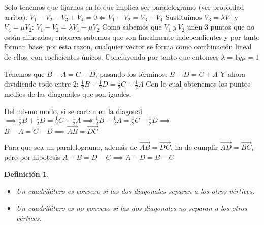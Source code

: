 \documentclass[11pt, a4paper, titlepage]{article}
\makeatletter
\renewenvironment{proof}[1][\proofname] {\vspace{-15pt}\par\pushQED{\qed}\normalfont\topsep6\p@\@plus6\p@\relax\trivlist\item[\hskip\labelsep\it#1\@addpunct{.}]\ignorespaces}{\popQED\endtrivlist\@endpefalse}
\renewcommand{\vec}{\overrightarrow}
\theoremstyle{theorem-style}
\theoremstyle{definition-style}
\newtheorem*{ndef}{Definición}
\theoremstyle{remark-style}
\theoremstyle{example-style}
\makeatother
\begin{document}
\begin{proof}\hfill
  Solo tenemos que fijarnos en lo que implica ser paralelogramo (ver propiedad arriba):
  $V_{1} - V_{2} - V_{3} + V_{4} = 0 \Leftrightarrow V_{1} - V_{2} = V_{3} - V_{4} $
  Sustituimos $V_{3} = \lambda V_{1}$ y $V_{4} = \mu V_{2}$:
  $V_{1} - V_{2} = \lambda V_{1} - \mu V_{2}$
  Como sabemos que $V_{1}\ y\ V_{2}$ unen 3 puntos que no están alineados, entonces sabemos que son linealmente independientes y por
  tanto forman base, por esta razon, cualquier vector se forma como combinación lineal de ellos, con coeficientes únicos.
  Concluyendo por tanto que entonces $\lambda = 1 y \mu = 1$

  Tenemos que $B - A = C - D$, pasando los términos:
  $B + D = C + A$
  Y ahora dividiendo todo entre 2:
  $\frac{1}{2}B + \frac{1}{2}D = \frac{1}{2}C + \frac{1}{2}A$
  Con lo cual obtenemos los puntos medios de las diagonales que son iguales.

   Del mismo modo, si se cortan en la diagonal 
  $\implies \frac{1}{2}B + \frac{1}{2}D = \frac{1}{2}C + \frac{1}{2}A \implies 
  \frac{1}{2}B - \frac{1}{2}A = \frac{1}{2}C - \frac{1}{2}D \implies $ $B - A = C - D \implies \vec{AB} = \vec{DC}$
  
   Para que sea un paralelogramo, además de $\vec{AB} = \vec{DC}$, ha de cumplir $\vec{AD} = \vec{BC}$, pero por hipotesis $A - B = D - C \implies A - D = B - C$
  
\end{proof}

\begin{ndef}
  \begin{itemize}
  \item Un cuadrilátero es convexo si las dos diagonales separan a los otros vértices.\\
  \item Un cuadrilátero es no convexo si las dos diagonales no separan a los otros vértices.
  \end{itemize}
\end{ndef}
\end{document}

